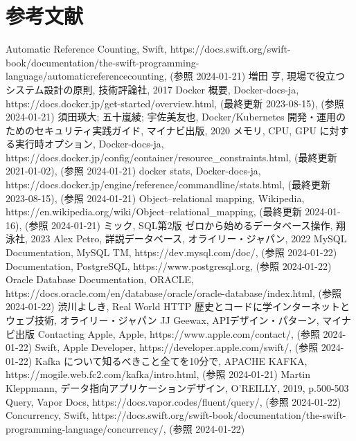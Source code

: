 \documentclass[../../main]{subfiles}
\begin{document}
    \section{参考文献}\label{sec:reference}

    \begin{thebibliography}{99}
         Automatic Reference Counting, Swift, https://docs.swift.org/swift-book/documentation/the-swift-programming-language/automaticreferencecounting, (参照 2024-01-21)
         増田 亨, 現場で役立つシステム設計の原則, 技術評論社, 2017
         Docker 概要, Docker-docs-ja, https://docs.docker.jp/get-started/overview.html, (最終更新 2023-08-15), (参照 2024-01-21)
         須田瑛大; 五十嵐綾; 宇佐美友也, Docker/Kubernetes 開発・運用のためのセキュリティ実践ガイド, マイナビ出版, 2020
         メモリ, CPU, GPU に対する実行時オプション, Docker-docs-ja, https://docs.docker.jp/config/container/resource\_constraints.html, (最終更新 2021-01-02), (参照 2024-01-21)
         docker stats, Docker-docs-ja, https://docs.docker.jp/engine/reference/commandline/stats.html, (最終更新 2023-08-15), (参照 2024-01-21)
         Object–relational mapping, Wikipedia, https://en.wikipedia.org/wiki/Object–relational\_mapping, (最終更新 2024-01-16), (参照 2024-01-21)
         ミック, SQL第2版 ゼロから始めるデータベース操作, 翔泳社, 2023
         Alex Petro, 詳説データベース, オライリー・ジャパン, 2022
         MySQL Documentation, MySQL TM, https://dev.mysql.com/doc/, (参照 2024-01-22)
         Documentation, PostgreSQL, https://www.postgresql.org, (参照 2024-01-22)
         Oracle Database Documentation, ORACLE, https://docs.oracle.com/en/database/oracle/oracle-database/index.html, (参照 2024-01-22)
         渋川よしき, Real World HTTP 歴史とコードに学インターネットとウェブ技術, オライリー・ジャパン
         JJ Geewax, APIデザイン・パターン, マイナビ出版
         Contacting Apple, Apple, https://www.apple.com/contact/, (参照 2024-01-22)
         Swift, Apple Developer, https://developer.apple.com/swift/, (参照 2024-01-22)
         Kafka について知るべきこと全てを10分で, APACHE KAFKA, https://mogile.web.fc2.com/kafka/intro.html, (参照 2024-01-21)
         Martin Kleppmann, データ指向アプリケーションデザイン, O'REILLY, 2019, p.500-503
         Query, Vapor Docs, https://docs.vapor.codes/fluent/query/, (参照 2024-01-22)
         Concurrency, Swift, https://docs.swift.org/swift-book/documentation/the-swift-programming-language/concurrency/, (参照 2024-01-22)
    \end{thebibliography}

    \clearpage
\end{document}
